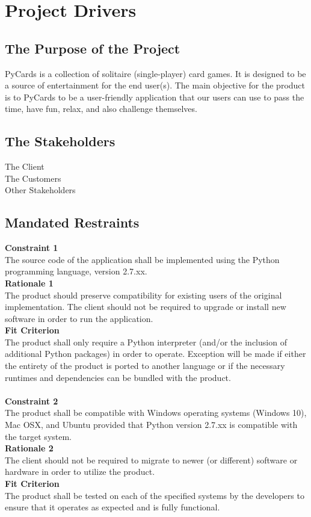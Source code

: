 \documentclass{article}
\begin{document}
	\tableofcontents
	\newpage
	\section{Project Drivers}
		\subsection{The Purpose of the Project}
		\indent \indent PyCards is a collection of solitaire 
		(single-player) card games. It is designed to be a source of 
		entertainment for the end 
		user(s). The main objective for the product is to PyCards to be a 
		user-friendly application that our users can use to pass the time, have 
		fun, relax, and also challenge themselves.
	\subsection{The Stakeholders}
		The Client\\
		The Customers\\
		Other Stakeholders
	\subsection{Mandated Restraints}
		\textbf{Constraint 1}\\
		\indent The source code of the application shall be implemented 
		using the Python programming language, version 2.7.xx.\\
		\textbf{Rationale 1}\\
		\indent The product should preserve compatibility for existing users of 
		the original implementation. The client should not be required to 
		upgrade or install new software in order to run the application.\\
		\textbf{Fit Criterion}\\
		\indent The product shall only require a Python interpreter 
		(and/or the inclusion of additional Python packages) in order to 
		operate. Exception will be made if either the entirety of the product 
		is ported to another language or if the necessary runtimes and 
		dependencies can be bundled with the product.\\\\
		
		\noindent \textbf{Constraint 2}\\
		\indent The product shall be compatible with Windows operating systems 
		(Windows 10), Mac OSX, and Ubuntu provided that Python version 2.7.xx 
		is compatible with the target system.\\
		\textbf{Rationale 2}\\
		\indent The client should not be required to migrate to newer (or 
		different) software or hardware in order to utilize the product.\\
		\textbf{Fit Criterion}\\
		\indent The product shall be tested on each of the specified systems by 
		the developers to ensure that it operates as expected and is fully 
		functional.\\\\
		
\end{document}
